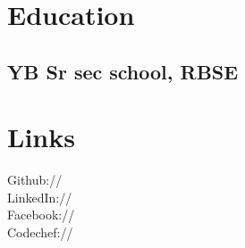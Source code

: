 \documentclass[]{deedy-resume-openfont}
\begin{document}
%
%
\lastupdated

%
%



%
%

\begin{minipage}[t]{0.33\textwidth} 


\section{Education} 



\sectionsep

\subsection{YB Sr sec school, RBSE}
\sectionsep


\section{Links} 
Github:// \href{https://github.com/bitwscrappy}{} \\
LinkedIn://  \href{https://www.linkedin.com/in/sahil-singh-195363b9/}{} \\
Facebook://  \href{https://www.facebook.com/bitwscrappy}{}\\
Codechef://  \href{https://discuss.codechef.com/users/93236/sahilzingh}{}
\sectionsep



\end{minipage}
\end{document}
